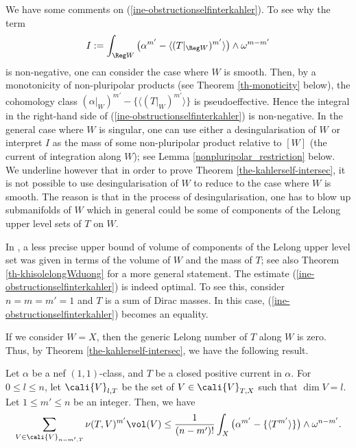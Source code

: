    We have some comments on (\ref{ine-obstructionselfinterkahler}). To see why the term $$I:= \int_{\Reg W} \big(\alpha^{m'}   -\langle (T|_{\Reg W})^{m'} \rangle \big) \wedge \omega^{m-m'}$$ is non-negative, one can consider the case where $W$ is smooth. Then, by a monotonicity of non-pluripolar products (see Theorem \ref{th-monoticity} below), the cohomology class $(\alpha|_W)^{m'}   -\{\langle (T|_{W})^{m'}\rangle\}$ is pseudoeffective. Hence the integral in the right-hand side of (\ref{ine-obstructionselfinterkahler}) is  non-negative. In the general case where $W$ is singular, one can use either a desingularisation of $W$ or interpret $I$ as the mass of some non-pluripolar product relative to $[W]$ (the current of integration along $W$); see Lemma \ref{nonpluripolar_restriction} below.
    We underline however that in order to prove Theorem \ref{the-kahlerself-intersec}, it is not possible to use desingularisation of $W$ to reduce to the case where $W$ is smooth. The reason is that in the process of desingularisation, one has to blow up submanifolds of $W$ which in general could be some of components of the Lelong upper level sets of $T$ on $W$. 

    
    In \cite{Do-Vu-lelong}, a less precise upper bound of volume of components of the Lelong upper level set was  given in terms of the volume of $W$ and the mass of $T$; see also Theorem \ref{th-khisolelongWduong} for a more general statement. The estimate (\ref{ine-obstructionselfinterkahler}) is indeed optimal. To see this, consider $n=m=m'=1$ and $T$ is a sum of Dirac masses. In this case, (\ref{ine-obstructionselfinterkahler}) becomes an equality.     

    If we consider $W=X$, then the generic Lelong number of $T$ along $W$ is zero. Thus, by Theorem \ref{the-kahlerself-intersec}, we have the following result.
  
  
    \begin{corollary}    \label{cor-W=X}
        Let $\alpha$ be a nef $(1,1)$-class, and $T$ be a closed positive current in $\alpha$. For $0 \le l \le n$, let $\cali{V}_{l,T}$ be the set of $V \in \cali{V}_{T,X}$ such that $\dim V = l$.
        Let $1\le m' \le n$ be an integer. Then, we have  
        \begin{align*}
            \sum_{V \in \cali{V}_{n-m',T}} \nu(T,V)^{m'} \vol(V)  \le  \frac{1}{(n-m')!}\int_{X} \big{(}\alpha^{m'}  - \{\langle T^{m'} \rangle \} \big{)} \wedge \omega^{n-m'}.
        \end{align*}
    \end{corollary}


